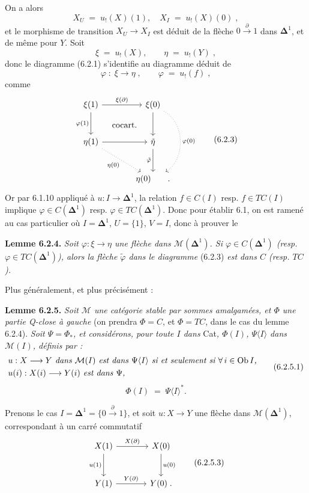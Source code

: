 \documentclass[11pt]{article}
\newcommand{\printedpage}[1]{\marginpar{\footnotesize p.~#1}}
\newcommand{\msp}[1]{\marginpar{\footnotesize [#1]}}
\newcommand{\Ob}{\operatorname{Ob}}
\newcommand{\Dl}{\boldsymbol{\Delta}}
\begin{document}
\msp{page 106}
On a alors
\[
X_U \;=\; u_!(X)(1), \quad X_I \;=\; u_!(X)(0)\;,
\]
et le morphisme de transition $X_U \longrightarrow X_I$ est déduit de la flèche $0 \xrightarrow{\ \partial\ } 1$ dans $\Dl^1$, et de même pour $Y$. Soit
\[
\xi \;=\; u_!(X), \qquad \eta \;=\; u_!(Y)\;,
\]
\printedpage{53}
donc le diagramme (6.2.1) s'identifie au diagramme déduit de
\[
\varphi \;:\; \xi \longrightarrow \eta\;, \qquad \varphi \;=\; u_!(f)\;,
\]
comme
\[
\begin{tikzcd}[row sep=large, column sep=large]
\xi(1) \arrow[r, "\xi(\partial)"] \arrow[d, "\varphi(1)"'] \arrow[dr, phantom, "\text{cocart.}"] & \xi(0) \arrow[d] \arrow[dd, dotted, bend left=60, "\varphi(0)"] \\
\eta(1) \arrow[r] \arrow[dr, dotted, "\eta(0)"'] & \tilde{\eta} \arrow[d, "\tilde{\varphi}"'] \\
 & \eta(0) \qquad .
\end{tikzcd}
\tag*{(6.2.3)}
\]
Or par 6.1.10 appliqué à $u : I \longrightarrow \Dl^1$, la relation $f \in C(I)$ resp. $f \in TC(I)$ implique $\varphi \in C(\Dl^1)$ resp. $\varphi \in TC(\Dl^1)$. Donc pour établir 6.1, on est ramené au cas particulier où $I = \Dl^1$, $U = \{1\}$, $V = I$, donc à prouver le

\textbf{Lemme 6.2.4.} \textit{Soit $\varphi : \xi \longrightarrow \eta$ une flèche dans $\mathcal{M}(\Dl^1)$. Si $\varphi \in C(\Dl^1)$ (resp.}
\msp{page 107}
\textit{$\varphi \in TC(\Dl^1)$), alors la flèche $\tilde{\varphi}$ dans le diagramme} (6.2.3) \textit{est dans $C$ (resp. $TC$).}

Plus généralement, et plus précisément :

\textbf{Lemme 6.2.5.} \textit{Soit $\mathcal{M}$ une catégorie stable par sommes amalgamées, et $\Phi$ une partie Q-close à gauche} (on prendra $\Phi = C$, et $\Phi = TC$, dans le cas du lemme 6.2.4). \textit{Soit $\Psi = \Phi_{*}$, et considérons, pour toute $I$ dans} Cat\textit{, $\Phi(I)$, $\Psi\langle I\rangle$ dans $\mathcal{M}(I)$, définis par :}
\[
\begin{aligned}
&\text{\textit{$u : X \longrightarrow Y$ dans $\mathcal{M}(I)$ est dans $\Psi\langle I\rangle$ si et seulement si $\forall\, i \in \Ob I$,}}\\
&\text{\textit{$u(i) : X(i) \longrightarrow Y(i)$ est dans $\Psi$,}}
\end{aligned}
\tag*{(6.2.5.1)}
\]
\[
\Phi(I) \;=\; \Psi\langle I\rangle^{*}.
\tag*{(6.2.5.2)}
\]

Prenons le cas $I = \Dl^1 = \{0 \xrightarrow{\ \partial\ } 1\}$, et soit $u : X \longrightarrow Y$ une flèche dans $\mathcal{M}(\Dl^1)$, correspondant à un carré commutatif
\[
\begin{tikzcd}[row sep=large, column sep=large]
X(1) \arrow[r, "X(\partial)"] \arrow[d, "u(1)"'] & X(0) \arrow[d, "u(0)"] \\
Y(1) \arrow[r, "Y(\partial)"] & Y(0)\;.
\end{tikzcd}
\tag*{(6.2.5.3)}
\]
\end{document}
